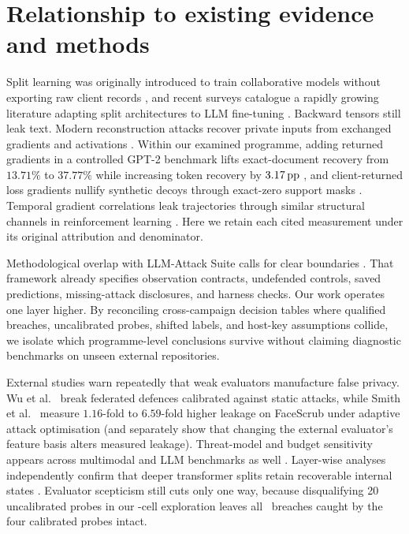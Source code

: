 \section{Relationship to existing evidence and methods}
\label{sec:related}

Split learning was originally introduced to train collaborative models
without exporting raw client records \cite{vepakomma2018}, and recent
surveys catalogue a rapidly growing literature adapting split architectures
to LLM fine-tuning \cite{splitsurvey2026}. Backward tensors still leak
text. Modern reconstruction attacks recover private inputs from exchanged
gradients and activations \cite{gisurvey2022,dager2024,fedspy2026}. Within
our examined programme, adding returned gradients in a controlled GPT-2
benchmark lifts exact-document recovery from $13.71\%$ to $37.77\%$ while
increasing token recovery by $3.17\,\mathrm{pp}$ \cite{gradients2026}, and
client-returned loss gradients nullify synthetic decoys through exact-zero
support masks \cite{paper1}. Temporal gradient correlations leak
trajectories through similar structural channels in reinforcement learning
\cite{trace2026}. Here we retain each cited measurement under its original
attribution and denominator.

Methodological overlap with LLM-Attack Suite calls for clear boundaries
\cite{suite2026}. That framework already specifies observation contracts,
undefended controls, saved predictions, missing-attack disclosures, and
harness checks. Our work operates one layer higher. By reconciling
cross-campaign decision tables where qualified breaches, uncalibrated
probes, shifted labels, and host-key assumptions collide, we isolate which
programme-level conclusions survive without claiming diagnostic benchmarks
on unseen external repositories.

External studies warn repeatedly that weak evaluators manufacture false
privacy. Wu et al.\ \cite{adaptive2022} break federated defences calibrated
against static attacks, while Smith et al.\ \cite{mia2026} measure
$1.16$-fold to $6.59$-fold higher leakage on FaceScrub under adaptive
attack optimisation (and separately show that changing the external
evaluator's feature basis alters measured leakage). Threat-model and budget
sensitivity appears across multimodal and LLM benchmarks as well
\cite{labelbudget2026,ablation2026}. Layer-wise analyses independently
confirm that deeper transformer splits retain recoverable internal states
\cite{depth2025,actinv2026,bettisplit2026}. Evaluator scepticism still cuts
only one way, because disqualifying 20 uncalibrated probes in our
\RoneCells-cell exploration leaves all \RoneQualifiedBreaches\ breaches
caught by the four calibrated probes intact.

